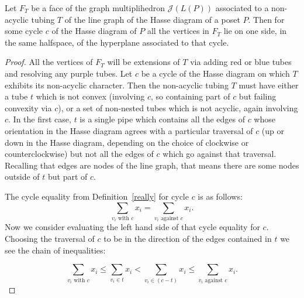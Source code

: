\documentclass{article}
\newcommand{\precdot}{\prec\mathrel{\mkern-5mu}\mathrel{\cdot}}
\begin{document}
\begin{lemma}\label{uno}
    Let $F_T$ be a face of the graph multiplihedron $\mathcal{J}(L(P))$ associated to a non-acyclic tubing $T$ of the line graph of the Hasse diagram of a poset  $P$. Then for some cycle $c$ of the Hasse diagram of $P$ all the vertices in $F_T$ lie on one side, in the same halfspace, of the hyperplane associated to that cycle. 
    \end{lemma}
    \begin{proof}
         All the vertices of $F_T$ will be extensions of $T$ via adding red or blue tubes and resolving any purple tubes. Let $c$ be a cycle of the Hasse diagram on which $T$ exhibits its non-acyclic character.  Then the non-acyclic tubing $T$ must have either a tube $t$ which is not convex (involving $c$, so containing part of $c$ but failing convexity via $c$), or a set of non-nested tubes which is not acyclic, again involving $c$. In the first case,  $t$ is a single pipe which  contains all the edges of $c$ whose orientation in the Hasse diagram agrees with a particular traversal of $c$ (up or down in the Hasse diagram, depending on the choice of clockwise or counterclockwise) but not all the edges of $c$ which go against that traversal. Recalling that edges are nodes of the line graph, that means there are some nodes outside of $t$ but part of $c$.
         
         The cycle equality from  Definition~\ref{really} for cycle $c$ is as follows: $$\sum_{v_i \text{ with }c }x_i = \sum_{v_i \text{ against } c}x_i.$$ Now we consider evaluating the left hand side of that cycle equality for $c$.  Choosing the traversal of $c$ to be in the direction of the edges contained in $t$ we see the chain of inequalities: 
         

$$\sum_{v_i\text{ with }c} x_i
\le \sum_{v_i \in t} x_i
< \sum_{v_i\in (c - t)} x_i
\le \sum_{v_i\text{ against }c} x_i .$$


\end{proof}
\end{document}
